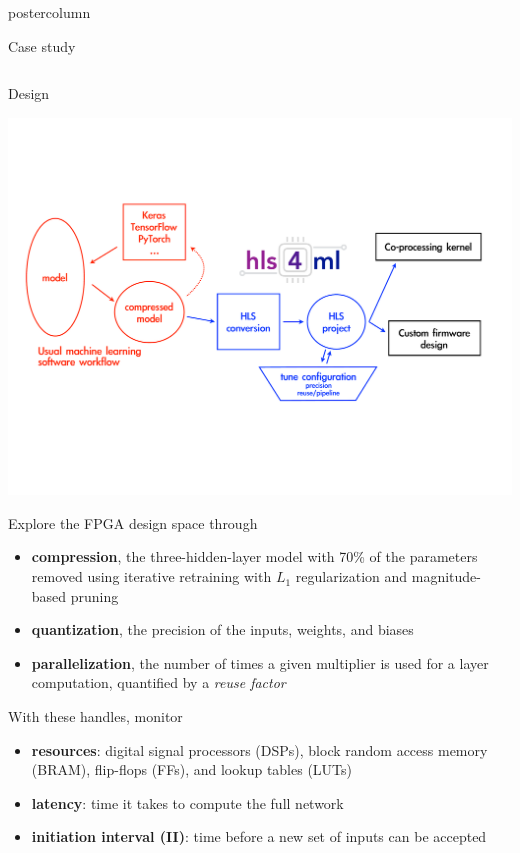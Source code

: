 \documentclass[final,hyperref={pdfpagelabels=false}]{beamer}
\begin{document}
\begin{frame}
\begin{columns}
\begin{column}{.49\textwidth}
\begin{beamercolorbox}[center,wd=\textwidth]{postercolumn}
\begin{minipage}[T]{.95\textwidth}
{\begin{block}{Case study}
\begin{columns}
\begin{column}{.49\textwidth}
                \end{column}
                \end{columns}
              \end{block}
            \begin{block}{Design}
                  \begin{center}
                    \includegraphics[width=\linewidth]{figures/flow-hls4ml.pdf}
                  \end{center}
                Explore the FPGA design space through
                \begin{itemize}
                \item {\bf compression}, the three-hidden-layer model with 70\% of the parameters removed using iterative retraining with $L_1$ regularization and magnitude-based pruning
                \item {\bf quantization}, the precision of the inputs, weights, and biases
                \item {\bf parallelization}, the number of times a
                  given multiplier is used for a layer computation,
                  quantified by a \emph{reuse factor}
                \end{itemize}
                \vspace{0.5in}
                With these handles, monitor 
                \begin{itemize}
                \item {\bf resources}: digital signal processors
                  (DSPs), block random access memory (BRAM), flip-flops (FFs), and lookup tables (LUTs)
                \item {\bf latency}: time it takes to compute the full network
                \item {\bf initiation interval (II)}: time before a new set of inputs can be accepted
                \end{itemize}
              \end{block}
              
}
\end{minipage}
\end{beamercolorbox}
\end{column}
\end{columns}
\end{frame}
\end{document}
